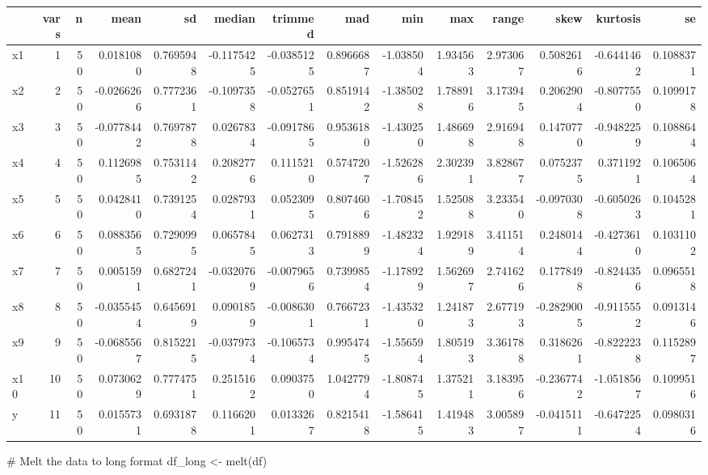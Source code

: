 \documentclass[
  letterpaper,
  DIV=11,
  numbers=noendperiod]{scrartcl}
\newenvironment{Shaded}{\begin{snugshade}}{\end{snugshade}}
\newcommand{\CommentTok}[1]{\textcolor[rgb]{0.37,0.37,0.37}{#1}}
\newcommand{\FunctionTok}[1]{\textcolor[rgb]{0.28,0.35,0.67}{#1}}
\newcommand{\NormalTok}[1]{\textcolor[rgb]{0.00,0.23,0.31}{#1}}
\newcommand{\OtherTok}[1]{\textcolor[rgb]{0.00,0.23,0.31}{#1}}
\begin{document}
\begin{table}
\centering
\begin{tabular}[t]{l|r|r|r|r|r|r|r|r|r|r|r|r|r}
\hline
  & vars & n & mean & sd & median & trimmed & mad & min & max & range & skew & kurtosis & se\\
\hline
x1 & 1 & 50 & 0.0181080 & 0.7695948 & -0.1175425 & -0.0385125 & 0.8966687 & -1.038504 & 1.934563 & 2.973067 & 0.5082616 & -0.6441462 & 0.1088371\\
\hline
x2 & 2 & 50 & -0.0266266 & 0.7772361 & -0.1097358 & -0.0527651 & 0.8519142 & -1.385028 & 1.788916 & 3.173945 & 0.2062904 & -0.8077550 & 0.1099178\\
\hline
x3 & 3 & 50 & -0.0778442 & 0.7697878 & 0.0267834 & -0.0917865 & 0.9536180 & -1.430250 & 1.486698 & 2.916948 & 0.1470770 & -0.9482259 & 0.1088644\\
\hline
x4 & 4 & 50 & 0.1126985 & 0.7531142 & 0.2082776 & 0.1115210 & 0.5747207 & -1.526286 & 2.302391 & 3.828677 & 0.0752375 & 0.3711921 & 0.1065064\\
\hline
x5 & 5 & 50 & 0.0428410 & 0.7391254 & 0.0287931 & 0.0523095 & 0.8074606 & -1.708452 & 1.525088 & 3.233540 & -0.0970308 & -0.6050263 & 0.1045281\\
\hline
x6 & 6 & 50 & 0.0883565 & 0.7290995 & 0.0657845 & 0.0627313 & 0.7918899 & -1.482324 & 1.929189 & 3.411514 & 0.2480144 & -0.4273610 & 0.1031102\\
\hline
x7 & 7 & 50 & 0.0051591 & 0.6827241 & -0.0320769 & -0.0079656 & 0.7399854 & -1.178929 & 1.562697 & 2.741626 & 0.1778498 & -0.8244356 & 0.0965518\\
\hline
x8 & 8 & 50 & -0.0355454 & 0.6456919 & 0.0901859 & -0.0086301 & 0.7667231 & -1.435320 & 1.241873 & 2.677193 & -0.2829005 & -0.9115552 & 0.0913146\\
\hline
x9 & 9 & 50 & -0.0685567 & 0.8152215 & -0.0379734 & -0.1065734 & 0.9954745 & -1.556594 & 1.805193 & 3.361788 & 0.3186261 & -0.8222238 & 0.1152897\\
\hline
x10 & 10 & 50 & 0.0730629 & 0.7774751 & 0.2515162 & 0.0903750 & 1.0427794 & -1.808745 & 1.375211 & 3.183956 & -0.2367742 & -1.0518567 & 0.1099516\\
\hline
y & 11 & 50 & 0.0155731 & 0.6931878 & 0.1166201 & 0.0133267 & 0.8215418 & -1.586415 & 1.419483 & 3.005897 & -0.0415111 & -0.6472254 & 0.0980316\\
\hline
\end{tabular}
\end{table}

\begin{Shaded}
\begin{Highlighting}[]
\CommentTok{\# Melt the data to long format}
\NormalTok{df\_long }\OtherTok{\textless{}{-}} \FunctionTok{melt}\NormalTok{(df)}
\end{Highlighting}
\end{Shaded}
\end{document}
